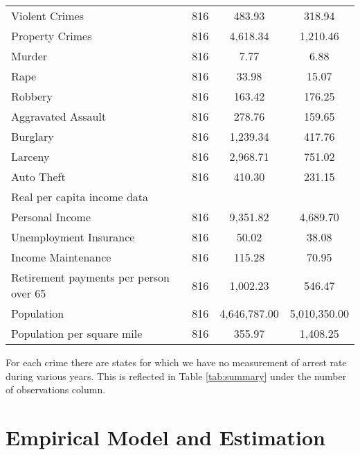 \documentclass{article}
\begin{document}
\begin{table}[H]
\begin{tabular}[h]{@{\extracolsep{5pt}}lccc}
\hspace{3mm}Violent Crimes & 816 & 483.93 & 318.94 \\ 
\hspace{3mm}Property Crimes & 816 & 4,618.34 & 1,210.46 \\ 
\hspace{3mm}Murder & 816 & 7.77 & 6.88 \\ 
\hspace{3mm}Rape & 816 & 33.98 & 15.07 \\ 
\hspace{3mm}Robbery& 816 & 163.42 & 176.25 \\ 
\hspace{3mm}Aggravated Assault & 816 & 278.76 & 159.65 \\ 
\hspace{3mm}Burglary & 816 & 1,239.34 & 417.76 \\ 
\hspace{3mm}Larceny & 816 & 2,968.71 & 751.02 \\ 
\hspace{3mm}Auto Theft & 816 & 410.30 & 231.15 \\ 
Real per capita income data &&&\\
\hspace{3mm}Personal Income & 816 & 9,351.82 & 4,689.70 \\ 
\hspace{3mm}Unemployment Insurance & 816 & 50.02 & 38.08 \\ 
\hspace{3mm}Income Maintenance & 816 & 115.28 & 70.95 \\ 
\hspace{3mm}Retirement payments per person over 65 & 816 & 1,002.23 & 546.47 \\ 
Population & 816 & 4,646,787.00 & 5,010,350.00 \\ 
Population per square mile & 816 & 355.97 & 1,408.25 \\ 
\bottomrule
\end{tabular} 
\end{table} 

For each crime there are states for which we have no measurement of arrest rate during various years. This is reflected in Table \ref{tab:summary} under the number of observations column.

\section*{Empirical Model and Estimation}
\end{document}
